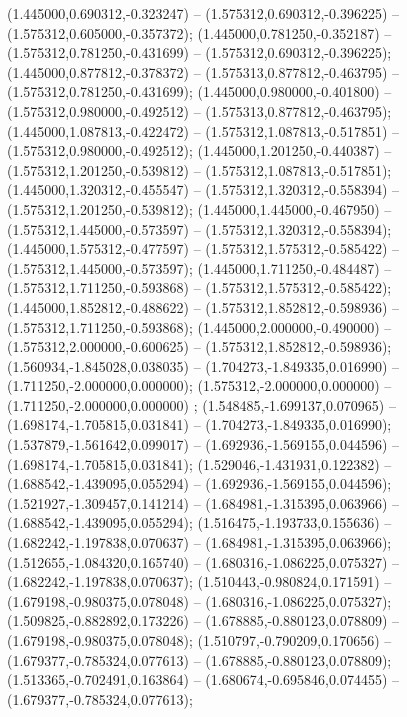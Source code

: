  (1.445000,0.690312,-0.323247) -- (1.575312,0.690312,-0.396225) -- (1.575312,0.605000,-0.357372);
 (1.445000,0.781250,-0.352187) -- (1.575312,0.781250,-0.431699) -- (1.575312,0.690312,-0.396225);
 (1.445000,0.877812,-0.378372) -- (1.575313,0.877812,-0.463795) -- (1.575312,0.781250,-0.431699);
 (1.445000,0.980000,-0.401800) -- (1.575312,0.980000,-0.492512) -- (1.575313,0.877812,-0.463795);
 (1.445000,1.087813,-0.422472) -- (1.575312,1.087813,-0.517851) -- (1.575312,0.980000,-0.492512);
 (1.445000,1.201250,-0.440387) -- (1.575312,1.201250,-0.539812) -- (1.575312,1.087813,-0.517851);
 (1.445000,1.320312,-0.455547) -- (1.575312,1.320312,-0.558394) -- (1.575312,1.201250,-0.539812);
 (1.445000,1.445000,-0.467950) -- (1.575312,1.445000,-0.573597) -- (1.575312,1.320312,-0.558394);
 (1.445000,1.575312,-0.477597) -- (1.575312,1.575312,-0.585422) -- (1.575312,1.445000,-0.573597);
 (1.445000,1.711250,-0.484487) -- (1.575312,1.711250,-0.593868) -- (1.575312,1.575312,-0.585422);
 (1.445000,1.852812,-0.488622) -- (1.575312,1.852812,-0.598936) -- (1.575312,1.711250,-0.593868);
 (1.445000,2.000000,-0.490000) -- (1.575312,2.000000,-0.600625) -- (1.575312,1.852812,-0.598936);
 (1.560934,-1.845028,0.038035) -- (1.704273,-1.849335,0.016990) -- (1.711250,-2.000000,0.000000);
 (1.575312,-2.000000,0.000000) -- (1.711250,-2.000000,0.000000) ;
 (1.548485,-1.699137,0.070965) -- (1.698174,-1.705815,0.031841) -- (1.704273,-1.849335,0.016990);
 (1.537879,-1.561642,0.099017) -- (1.692936,-1.569155,0.044596) -- (1.698174,-1.705815,0.031841);
 (1.529046,-1.431931,0.122382) -- (1.688542,-1.439095,0.055294) -- (1.692936,-1.569155,0.044596);
 (1.521927,-1.309457,0.141214) -- (1.684981,-1.315395,0.063966) -- (1.688542,-1.439095,0.055294);
 (1.516475,-1.193733,0.155636) -- (1.682242,-1.197838,0.070637) -- (1.684981,-1.315395,0.063966);
 (1.512655,-1.084320,0.165740) -- (1.680316,-1.086225,0.075327) -- (1.682242,-1.197838,0.070637);
 (1.510443,-0.980824,0.171591) -- (1.679198,-0.980375,0.078048) -- (1.680316,-1.086225,0.075327);
 (1.509825,-0.882892,0.173226) -- (1.678885,-0.880123,0.078809) -- (1.679198,-0.980375,0.078048);
 (1.510797,-0.790209,0.170656) -- (1.679377,-0.785324,0.077613) -- (1.678885,-0.880123,0.078809);
 (1.513365,-0.702491,0.163864) -- (1.680674,-0.695846,0.074455) -- (1.679377,-0.785324,0.077613);
